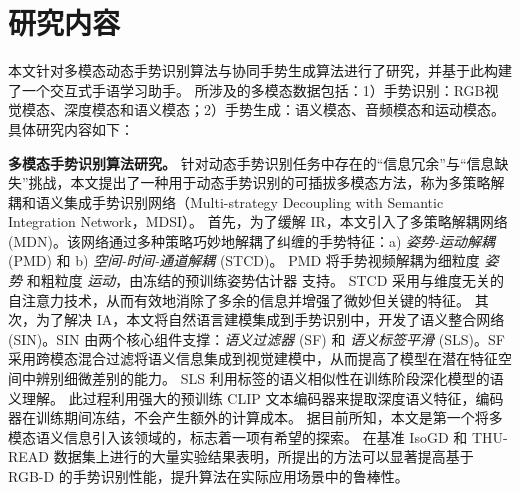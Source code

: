 

\section{研究内容}

本文针对多模态动态手势识别算法与协同手势生成算法进行了研究，并基于此构建了一个交互式手语学习助手。
所涉及的多模态数据包括：1）手势识别：RGB视觉模态、深度模态和语义模态；2）手势生成：语义模态、音频模态和运动模态。
具体研究内容如下：


\textbf{多模态手势识别算法研究。} 针对动态手势识别任务中存在的“信息冗余”与“信息缺失”挑战，本文提出了一种用于动态手势识别的可插拔多模态方法，称为多策略解耦和语义集成手势识别网络（Multi-strategy Decoupling with Semantic Integration Network，MDSI）。
首先，为了缓解 IR，本文引入了多策略解耦网络 (MDN)。该网络通过多种策略巧妙地解耦了纠缠的手势特征：a) \emph{姿势-运动解耦} (PMD) 和 b) \emph{空间-时间-通道解耦} (STCD)。
PMD 将手势视频解耦为细粒度 \emph{姿势} 和粗粒度 \emph{运动}，由冻结的预训练姿势估计器 \cite{sun2019deep} 支持。
STCD 采用与维度无关的自注意力技术，从而有效地消除了多余的信息并增强了微妙但关键的特征。
其次，为了解决 IA，本文将自然语言建模集成到手势识别中，开发了语义整合网络 (SIN)。SIN 由两个核心组件支撑：\emph{语义过滤器} (SF) 和 \emph{语义标签平滑} (SLS)。SF 采用跨模态混合过滤将语义信息集成到视觉建模中，从而提高了模型在潜在特征空间中辨别细微差别的能力。
SLS 利用标签的语义相似性在训练阶段深化模型的语义理解。
此过程利用强大的预训练 CLIP 文本编码器来提取深度语义特征，编码器在训练期间冻结，不会产生额外的计算成本。
据目前所知，本文是第一个将多模态语义信息引入该领域的，标志着一项有希望的探索。
在基准 IsoGD 和 THU-READ 数据集上进行的大量实验结果表明，所提出的方法可以显著提高基于 RGB-D 的手势识别性能，提升算法在实际应用场景中的鲁棒性。

